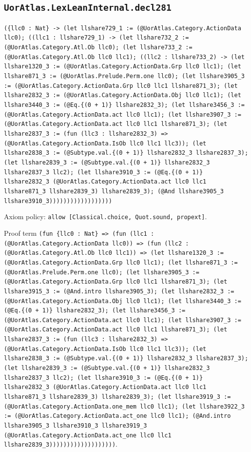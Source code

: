 \documentclass[11pt]{article}
\begin{document}
\subsection*{\texttt{UorAtlas.LexLeanInternal.decl281}}
\noindent\texttt{(\{llc0 : Nat\} -> (let llshare729\_1 := (@UorAtlas.Category.ActionData llc0); ((llc1 : llshare729\_1) -> (let llshare732\_2 := (@UorAtlas.Category.Atl.Ob llc0); (let llshare733\_2 := (@UorAtlas.Category.Atl.Ob llc0 llc1); ((llc2 : llshare733\_2) -> (let llshare1320\_3 := (@UorAtlas.Category.ActionData.Grp llc0 llc1); (let llshare871\_3 := (@UorAtlas.Prelude.Perm.one llc0); (let llshare3905\_3 := (@UorAtlas.Category.ActionData.Grp llc0 llc1 llshare871\_3); (let llshare2832\_3 := (@UorAtlas.Category.ActionData.Obj llc0 llc1); (let llshare3440\_3 := (@Eq.\{(0 + 1)\} llshare2832\_3); (let llshare3456\_3 := (@UorAtlas.Category.ActionData.act llc0 llc1); (let llshare3907\_3 := (@UorAtlas.Category.ActionData.act llc0 llc1 llshare871\_3); (let llshare2837\_3 := (fun (llc3 : llshare2832\_3) => (@UorAtlas.Category.ActionData.IsOb llc0 llc1 llc3)); (let llshare2838\_3 := (@Subtype.val.\{(0 + 1)\} llshare2832\_3 llshare2837\_3); (let llshare2839\_3 := (@Subtype.val.\{(0 + 1)\} llshare2832\_3 llshare2837\_3 llc2); (let llshare3910\_3 := (@Eq.\{(0 + 1)\} llshare2832\_3 (@UorAtlas.Category.ActionData.act llc0 llc1 llshare871\_3 llshare2839\_3) llshare2839\_3); (@And llshare3905\_3 llshare3910\_3))))))))))))))))))}\par
\noindent Axiom policy: \texttt{allow [Classical.choice, Quot.sound, propext]}.\par
\noindent Proof term \texttt{(fun \{llc0 : Nat\} => (fun (llc1 : (@UorAtlas.Category.ActionData llc0)) => (fun (llc2 : (@UorAtlas.Category.Atl.Ob llc0 llc1)) => (let llshare1320\_3 := (@UorAtlas.Category.ActionData.Grp llc0 llc1); (let llshare871\_3 := (@UorAtlas.Prelude.Perm.one llc0); (let llshare3905\_3 := (@UorAtlas.Category.ActionData.Grp llc0 llc1 llshare871\_3); (let llshare3915\_3 := (@And.intro llshare3905\_3); (let llshare2832\_3 := (@UorAtlas.Category.ActionData.Obj llc0 llc1); (let llshare3440\_3 := (@Eq.\{(0 + 1)\} llshare2832\_3); (let llshare3456\_3 := (@UorAtlas.Category.ActionData.act llc0 llc1); (let llshare3907\_3 := (@UorAtlas.Category.ActionData.act llc0 llc1 llshare871\_3); (let llshare2837\_3 := (fun (llc3 : llshare2832\_3) => (@UorAtlas.Category.ActionData.IsOb llc0 llc1 llc3)); (let llshare2838\_3 := (@Subtype.val.\{(0 + 1)\} llshare2832\_3 llshare2837\_3); (let llshare2839\_3 := (@Subtype.val.\{(0 + 1)\} llshare2832\_3 llshare2837\_3 llc2); (let llshare3910\_3 := (@Eq.\{(0 + 1)\} llshare2832\_3 (@UorAtlas.Category.ActionData.act llc0 llc1 llshare871\_3 llshare2839\_3) llshare2839\_3); (let llshare3919\_3 := (@UorAtlas.Category.ActionData.one\_mem llc0 llc1); (let llshare3922\_3 := (@UorAtlas.Category.ActionData.act\_one llc0 llc1); (@And.intro llshare3905\_3 llshare3910\_3 llshare3919\_3 (@UorAtlas.Category.ActionData.act\_one llc0 llc1 llshare2839\_3)))))))))))))))))))}.\par
\end{document}

